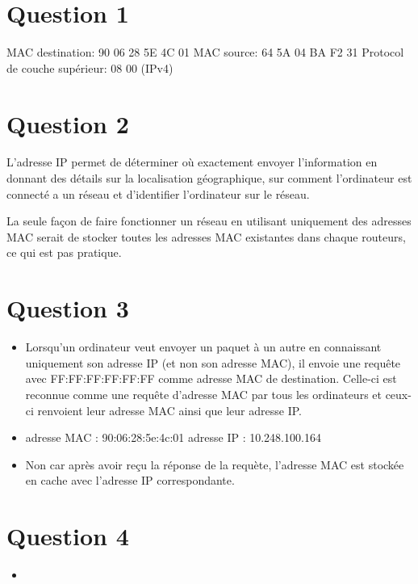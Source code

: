 
\section{Question 1}
MAC destination: 90 06 28 5E 4C 01 
MAC source: 64 5A 04 BA F2 31
Protocol de couche supérieur: 08 00 (IPv4)
\section{Question 2}
L'adresse IP permet de déterminer où exactement envoyer l'information  en donnant des détails sur la localisation géographique, sur comment l'ordinateur est connecté a un réseau et d'identifier l'ordinateur sur le réseau.

La seule façon de faire fonctionner un réseau en
utilisant uniquement des adresses MAC serait de
stocker toutes les adresses MAC existantes dans
chaque routeurs, ce qui est pas pratique.

\section{Question 3}
\begin{itemize}
	\item Lorsqu'un ordinateur veut envoyer un paquet à un autre en connaissant uniquement son adresse IP (et non son adresse MAC), il envoie une requête avec FF:FF:FF:FF:FF:FF comme adresse MAC de destination. Celle-ci est reconnue comme une requête d'adresse MAC par tous les ordinateurs et ceux-ci renvoient leur adresse MAC ainsi que leur adresse IP.
	\item adresse MAC : 90:06:28:5e:4c:01
	adresse IP : 10.248.100.164
	\item Non car après avoir reçu la réponse de
	la requète, l'adresse MAC est stockée en cache
	 avec l'adresse IP correspondante.
\end{itemize}

\section{Question 4}
\begin{itemize}
	\item 
\end{itemize}
